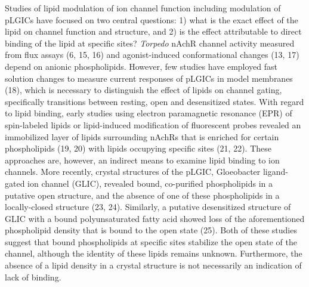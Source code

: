 Studies of lipid modulation of ion channel function including modulation
of pLGICs have focused on two central questions: 1) what is the exact
effect of the lipid on channel function and structure, and 2) is the
effect attributable to direct binding of the lipid at specific sites?
\emph{Torpedo} nAchR channel activity measured from flux assays (6, 15,
16) and agonist-induced conformational changes (13, 17) depend on
anionic phospholipids. However, few studies have employed fast solution
changes to measure current responses of pLGICs in model membranes (18),
which is necessary to distinguish the effect of lipids on channel
gating, specifically transitions between resting, open and desensitized
states. With regard to lipid binding, early studies using electron
paramagnetic resonance (EPR) of spin-labeled lipids or lipid-induced
modification of fluorescent probes revealed an immobilized layer of
lipids surrounding nAchRs that is enriched for certain phospholipids
(19, 20) with lipids occupying specific sites (21, 22). These approaches
are, however, an indirect means to examine lipid binding to ion
channels. More recently, crystal structures of the pLGIC, Gloeobacter
ligand-gated ion channel (GLIC), revealed bound, co-purified
phospholipids in a putative open structure, and the absence of one of
these phospholipids in a locally-closed structure (23, 24). Similarly, a
putative desensitized structure of GLIC with a bound polyunsaturated
fatty acid showed loss of the aforementioned phospholipid density that
is bound to the open state (25). Both of these studies suggest that
bound phospholipids at specific sites stabilize the open state of the
channel, although the identity of these lipids remains unknown.
Furthermore, the absence of a lipid density in a crystal structure is
not necessarily an indication of lack of binding.

